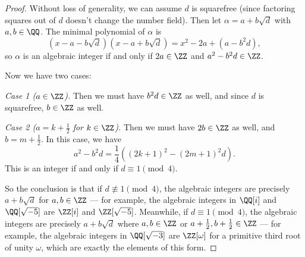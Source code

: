 \begin{proof}
Without loss of generality, we can assume $d$ is squarefree (since factoring squares out of $d$ doesn't change the number field). Then let $\alpha = a + b\sqrt{d}$ with $a, b \in \QQ$. The minimal polynomial of $\alpha$ is \[(x - a - b\sqrt{d})(x - a + b\sqrt{d}) = x^2 - 2a + (a - b^2d),\] so $\alpha$ is an algebraic integer if and only if $2a \in \ZZ$ and $a^2 - b^2d \in \ZZ$. 

Now we have two cases: 

\emph{Case 1 ($a \in \ZZ$).} Then we must have $b^2d \in \ZZ$ as well, and since $d$ is squarefree, $b \in \ZZ$ as well. 

\emph{Case 2 ($a = k + \frac{1}{2}$ for $k \in \ZZ$).} Then we must have $2b \in \ZZ$ as well, and $b = m + \frac{1}{2}$. In this case, we have \[a^2 - b^2d = \frac{1}{4}((2k + 1)^2 - (2m + 1)^2d).\] This is an integer if and only if $d \equiv 1 \pmod{4}$. 

So the conclusion is that if $d \not\equiv 1 \pmod{4}$, the algebraic integers are precisely $a + b\sqrt{d}$ for $a, b \in \ZZ$ --- for example, the algebraic integers in $\QQ[i]$ and $\QQ[\sqrt{-5}]$ are $\ZZ[i]$ and $\ZZ[\sqrt{-5}]$. Meanwhile, if $d \equiv 1 \pmod{4}$, the algebraic integers are precisely $a + b\sqrt{d}$ where $a, b \in \ZZ$ or $a + \frac{1}{2}, b + \frac{1}{2} \in \ZZ$ --- for example, the algebraic integers in $\QQ[\sqrt{-3}]$ are $\ZZ[\omega]$ for a primitive third root of unity $\omega$, which are exactly the elements of this form. 
\end{proof}



